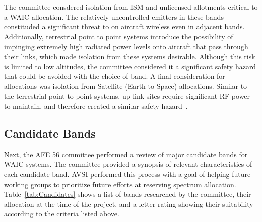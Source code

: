 The committee consdered isolation from ISM and unlicensed allotments critical to a WAIC allocation. The relatively uncontrolled emitters in these bands constituded a significant threat to on aircraft wireless even in adjacent bands. Additionally, terrestrial point to point systems introduce the possibility of impinging extremely high radiated power levels onto aircraft that pass through their links, which made isolation from these systems desirable. Although this risk is limited to low altitudes, the committee considered it a significant safety hazard that could be avoided with the choice of band. A final consideration for allocations was isolation from Satellite (Earth to Space) allocations. Similar to the terrestrial point to point systems, up-link sites require significant RF power to maintain, and therefore created a similar safety hazard~\cite{ferrell_feasibility_2007}. 

\subsection{Candidate Bands}
Next, the AFE 56 committee performed a review of major candidate bands for WAIC systems. The committee provided a synopsis of relevant characteristics of each candidate band. AVSI performed this process with a goal of helping future working groups to prioritize future efforts at reserving spectrum allocation. Table~\ref{tab:Candidates} shows a list of bands researched by the committee, their allocation at the time of the project, and a letter rating showing their suitability according to the criteria listed above. 

